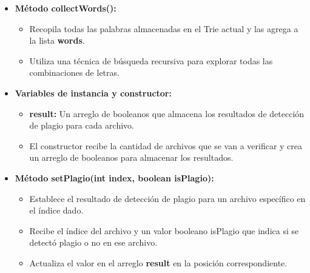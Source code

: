 \documentclass{article}
\begin{document}
	\begin{itemize}
	\item \textbf{Método collectWords():}
	 \begin{itemize}
	 \item Recopila todas las palabras almacenadas en el Trie actual y las agrega a la lista \textbf{words}. 
	 \item Utiliza una técnica de búsqueda recursiva para explorar todas las combinaciones de letras.
	 \end{itemize}
	\end{itemize}
	
	\begin{itemize}
	\item \textbf{Variables de instancia y constructor:}
	 \begin{itemize}
	 \item \textbf{result:} Un arreglo de booleanos que almacena los resultados de detección de plagio para cada archivo. 
	 \item El constructor recibe la cantidad de archivos que se van a verificar y crea un arreglo de booleanos para almacenar los resultados.
	 \end{itemize}
	\end{itemize}
	
	\begin{itemize}
	\item \textbf{Método setPlagio(int index, boolean isPlagio):}
	 \begin{itemize}
	 \item Establece el resultado de detección de plagio para un archivo específico en el índice dado.
	 \item Recibe el índice del archivo y un valor booleano isPlagio que indica si se detectó plagio o no en ese archivo.
	 \item Actualiza el valor en el arreglo \textbf{result} en la posición correspondiente.
	 \end{itemize}
	\end{itemize}
	
\end{document}

